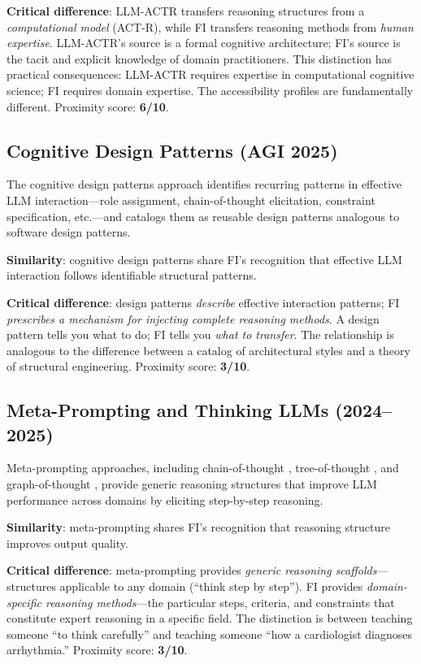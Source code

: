 \documentclass[12pt,a4paper]{article}
\begin{document}
\textbf{Critical difference}: LLM-ACTR transfers reasoning structures from a \emph{computational model} (ACT-R), while FI transfers reasoning methods from \emph{human expertise}. LLM-ACTR's source is a formal cognitive architecture; FI's source is the tacit and explicit knowledge of domain practitioners. This distinction has practical consequences: LLM-ACTR requires expertise in computational cognitive science; FI requires domain expertise. The accessibility profiles are fundamentally different. Proximity score: \textbf{6/10}.

\subsection{Cognitive Design Patterns (AGI 2025)}

The cognitive design patterns approach \cite{agi2025cognitive} identifies recurring patterns in effective LLM interaction---role assignment, chain-of-thought elicitation, constraint specification, etc.---and catalogs them as reusable design patterns analogous to software design patterns.

\textbf{Similarity}: cognitive design patterns share FI's recognition that effective LLM interaction follows identifiable structural patterns.

\textbf{Critical difference}: design patterns \emph{describe} effective interaction patterns; FI \emph{prescribes a mechanism for injecting complete reasoning methods}. A design pattern tells you what to do; FI tells you \emph{what to transfer}. The relationship is analogous to the difference between a catalog of architectural styles and a theory of structural engineering. Proximity score: \textbf{3/10}.

\subsection{Meta-Prompting and Thinking LLMs (2024--2025)}

Meta-prompting approaches, including chain-of-thought \cite{wei2022chain}, tree-of-thought \cite{yao2023tree}, and graph-of-thought \cite{besta2024graph}, provide generic reasoning structures that improve LLM performance across domains by eliciting step-by-step reasoning.

\textbf{Similarity}: meta-prompting shares FI's recognition that reasoning structure improves output quality.

\textbf{Critical difference}: meta-prompting provides \emph{generic reasoning scaffolds}---structures applicable to any domain (``think step by step''). FI provides \emph{domain-specific reasoning methods}---the particular steps, criteria, and constraints that constitute expert reasoning in a specific field. The distinction is between teaching someone ``to think carefully'' and teaching someone ``how a cardiologist diagnoses arrhythmia.'' Proximity score: \textbf{3/10}.
\end{document}
